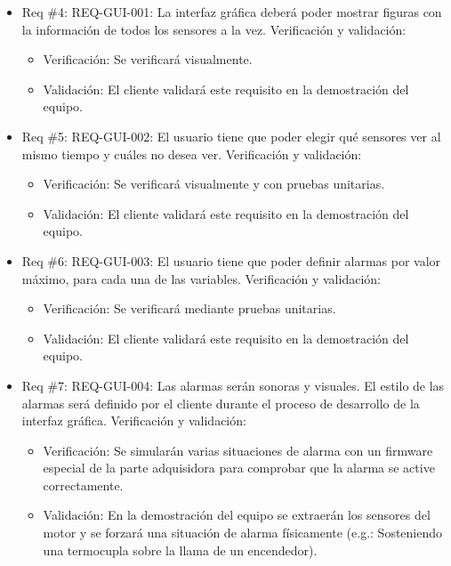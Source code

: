 \documentclass[11pt]{charter}
\begin{document}
\begin{itemize} 
\item Req \#4: REQ-GUI-001: La interfaz gráfica deberá poder mostrar figuras con la información
de todos los sensores a la vez.
Verificación y validación:
\begin{itemize}
\item Verificación: Se verificará visualmente.
\item Validación: El cliente validará este requisito en la demostración del equipo.
\end{itemize}
\end{itemize}

\begin{itemize} 
\item Req \#5: REQ-GUI-002: El usuario tiene que poder elegir qué sensores ver al mismo tiempo
y cuáles no desea ver.
Verificación y validación:
\begin{itemize}
\item Verificación: Se verificará visualmente y con pruebas unitarias.
\item Validación: El cliente validará este requisito en la demostración del equipo.
\end{itemize}
\end{itemize}

\begin{itemize} 
\item Req \#6: REQ-GUI-003: El usuario tiene que poder definir alarmas por valor máximo, para
cada una de las variables.
Verificación y validación:
\begin{itemize}
\item Verificación: Se verificará mediante pruebas unitarias.
\item Validación: El cliente validará este requisito en la demostración del equipo.
\end{itemize}
\end{itemize}

\begin{itemize} 
\item Req \#7: REQ-GUI-004: Las alarmas serán sonoras y visuales. El estilo de las alarmas será
definido por el cliente durante el proceso de desarrollo de la interfaz gráfica.
Verificación y validación:
\begin{itemize}
\item Verificación: Se simularán varias situaciones de alarma con un firmware especial de la parte adquisidora para comprobar que la alarma se active correctamente.
\item Validación: En la demostración del equipo se extraerán los sensores del motor y se forzará una situación de alarma físicamente (e.g.: Sosteniendo una termocupla sobre la llama de un encendedor).
\end{itemize}
\end{itemize}
\end{document}
